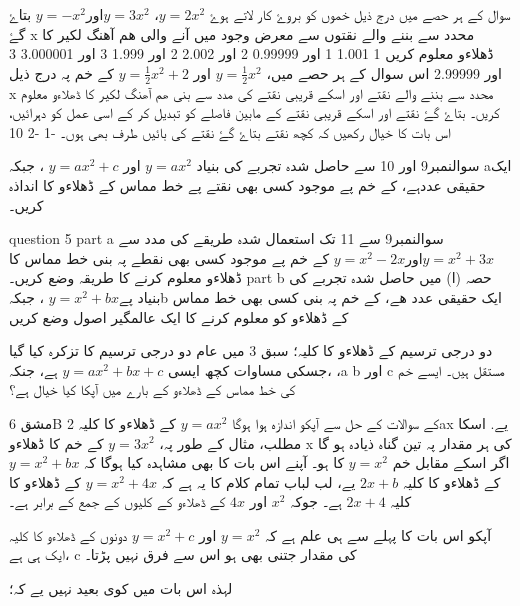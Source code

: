  سوال کے ہر حصے میں درج ذیل
  خموں کو بروۓ کار لاتے ہوۓ   \( y=2x^{2}\)، \( y=3x^{2}\)اور\( y=-x^{2}\)  بتاۓ گۓ x محدد سے بننے والے نقتوں سے معرض وجود میں آنے والی ھم آھنگ لکیر کا    ڈھلاءو معلوم کریں 
1       1.001
1    اور    0.99999
2    اور      2.002 
2      اور     1.999
3       اور    3.000001
3        اور   2.99999
اس سوال کے ہر حصے میں، \( y=\frac{1}{2} x^{2}\) اور  \( y=\frac{1}{2} x^{2}+2\)   کے خم پہ درج ذیل                 x محدد سے بننے والے  نقتے اور اسکے قریبی نقتے کی مدد سے بنی    ھم آھنگ لکیر کا ڈھلاءو معلوم کریں۔ بتاۓ گۓ نقتے اور اسکے قریبی نقتے کے مابین فاصلے کو تبدیل کر کے اسی عمل کو دہرائیں، اس بات کا خیال رکھیں کہ کچھ نقتے بتاۓ گۓ نقتے کی بائیں طرف بھی ہوں۔
-1
-2
10




سوالنمبر9 اور 10 سے حاصل شدہ تجربے کی بنیاد \( y=ax^{2} \) اور    \( y=ax^{2} +c \) ، جبکہ aایک حقیقی عددہے،  کے خم پے موجود کسی بھی نقتے پے خط مماس کے ڈھلاءو کا انداذہ کریں۔




question 5
part a
سوالنمبر9 سے 11 تک استعمال شدہ طریقے کی مدد سے      \( y=x^{2} +3x\)اور\( y=x^{2} -2x\) کے خم پے موجود کسی بھی نقطے پہ بنی خط مماس  کا ڈھلاءو معلوم کرنے کا طریقہ وضع کریں۔
part b
حصہ (ا) میں حاصل شدہ تجربے کی بنیاد پے\( y=x^{2} +bx\) ، جبکہb ایک حقیقی عدد ھے،   کے خم پہ بنی کسی بھی خط مماس کے ڈھلاءو کو معلوم کرنے کا ایک عالمگیر اصول وضع کریں 

دو درجی ترسیم کے ڈھلاءو کا کلیہ؛
سبق 3 میں عام دو درجی ترسیم کا تزکرہ کیا گیا ،جسکی مساوات کچھ ایسی  \(y=ax^{2}+bx +c\) ہے، جنکہ ،a      b         اور   c  مستقل ہیں۔ ایسے خم کی خط مماس کے ڈھلاءو کے بارے میں آپکا کیا خیال ہے؟

مشق  6B کے سوالات کے حل سے آپکو اندازہ ہوا ہوگا \( y=ax^{2}\) کے ڈھلاءو کا کلیہ  2ax یے. اسکا مطلب، مثال کے طور پہ،        \(y=3x^{2}\)    کے خم کا ڈھلاءو   x کی ہر مقدار پہ تین گناہ ذیادہ ہو گا اگر اسکے مقابل خم \(y=x^{2}\) کا ہو۔ آپنے اس بات کا بھی مشاہدہ کیا ہوگا کہ \(y=x^{2}+bx\)     کے ڈھلاءو کا کلیہ     \(2x +b\)  یے، لب لباب تمام کلام کا یہ ہے کہ  \(y=x^{2} +4x\)  کے  ڈھلاءو کا کلیہ   \( 2x+4\)  ہے۔ جوکہ \(x^{2}\) اور \( 4x\) کے ڈھلاءو کے کلیوں کے جمع کے برابر ہے۔


آپکو اس بات کا پہلے سے ہی علم ہے کہ    \(y=x^{2}\)   اور  \( y=x^{2}+c\)   دونوں کے ڈھلاءو کا کلیہ ایک ہی ہے،     c کی مقدار جتنی بھی ہو اس سے فرق نہیں پڑتا۔

لہذہ اس بات میں کوی بعید نہیں یے کہ؛


